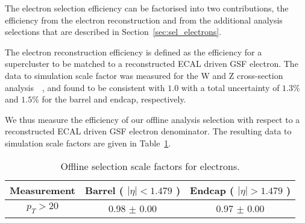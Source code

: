 
The electron selection efficiency can be factorised into two contributions,
the efficiency from the electron reconstruction and from the additional
analysis selections that are described in Section~\ref{sec:sel_electrons}.

The electron reconstruction efficiency is defined as the efficiency for a
supercluster to be matched to a reconstructed ECAL driven GSF electron.
The data to simulation scale factor was measured for the W and Z cross-section
analysis~\cite{VBTFCrossSectionNote}~\cite{ref:tagprobe_mit_w},
and found to be consistent with $1.0$ with a total uncertainty of
$1.3\%$ and $1.5\%$ for the barrel and endcap, respectively.

We thus measure the efficiency of our offline analysis selection 
with respect to a reconstructed ECAL driven GSF electron denominator. 
The resulting data to simulation scale factors are given in Table~\ref{tab:eff_ele_offline}.

\begin{table}[!ht]
\begin{center}
\begin{tabular}{c|c|c}
\hline
Measurement & Barrel ( $|\eta|<1.479$ )   & Endcap ( $|\eta|>1.479$ )  \\ 
\hline
$  p_T > 20 $ & 0.98 $\pm$ 0.00  & 0.97 $\pm$ 0.00  \\ \hline 
\end{tabular}
\caption{Offline selection scale factors for electrons.}
\label{tab:eff_ele_offline}
\end{center}
\end{table}

